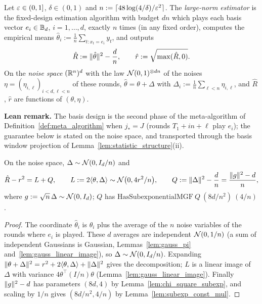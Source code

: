 \begin{definition}\label{def:large_norm_algorithm}
\leanok
{}
Let $\varepsilon \in (0,1]$, $\delta \in (0,1)$ and $n := \lceil 48\log(4/\delta)/\varepsilon^2 \rceil$. The
\emph{large-norm estimator} is the fixed-design estimation algorithm with budget $dn$ which
plays each basis vector $e_i \in \mathbb{B}_d$, $i = 1,\dots,d$, exactly $n$ times (in any fixed
order), computes the empirical means $\hat\theta_i := \frac1n\sum_{t : x_t = e_i} y_t$, and
outputs
\[
  \hat R := \lVert \hat\theta \rVert^2 - \frac dn, \qquad
  \hat r := \sqrt{\max(\hat R, 0)} .
\]
On the \emph{noise space} $(\mathbb{R}^n)^d$ with the law $\mathcal{N}(0,1)^{\otimes dn}$ of the noises
$\eta = (\eta_{i,\ell})_{i<d,\ell<n}$ of these rounds, $\hat\theta = \theta + \Delta$ with
$\Delta_i := \frac1n\sum_{\ell<n}\eta_{i,\ell}$, and $\hat R$, $\hat r$ are functions of
$(\theta, \eta)$.
\end{definition}

\textbf{Lean remark.} The basis design is the second phase of the meta-algorithm of
Definition~\ref{def:meta_algorithm} when $j_* = J$ (rounds $T_1 + in + \ell$ play $e_i$);
the guarantee below is stated on the noise space, and transported through the basis window
projection of Lemma~\ref{lem:statistic_structure}(ii).

\begin{lemma}\label{lem:large_norm_decomposition}
\leanok
{}
On the noise space, $\Delta \sim \mathcal{N}(0, I_d/n)$ and
\[
  \hat R - r^2 = L + Q, \qquad
  L := 2\langle \theta, \Delta \rangle \sim \mathcal{N}\big(0, 4r^2/n\big), \qquad
  Q := \lVert \Delta \rVert^2 - \frac dn = \frac{\lVert g \rVert^2 - d}{n},
\]
where $g := \sqrt n\,\Delta \sim \mathcal{N}(0, I_d)$; $Q$ has
$\mathrm{HasSubexponentialMGF}\ Q\ (8d/n^2)\ (4/n)$.
\end{lemma}

\begin{proof}
\leanok
{}
The coordinate $\hat\theta_i$ is $\theta_i$ plus the average of the $n$ noise variables of
the rounds where $e_i$ is played. These $d$ averages are independent
$\mathcal{N}(0,1/n)$ (a sum of independent Gaussians is Gaussian,
Lemmas~\ref{lem:gauss_pi} and~\ref{lem:gauss_linear_image}), so
$\Delta \sim \mathcal{N}(0, I_d/n)$. Expanding
$\lVert \theta + \Delta \rVert^2 = r^2 + 2\langle \theta, \Delta \rangle + \lVert \Delta \rVert^2$ gives the
decomposition; $L$ is a linear image of $\Delta$ with variance $4\theta^\top(I/n)\theta$
(Lemma~\ref{lem:gauss_linear_image}). Finally $\lVert g \rVert^2 - d$ has parameters $(8d, 4)$ by
Lemma~\ref{lem:chi_square_subexp}, and scaling by $1/n$ gives $(8d/n^2, 4/n)$ by
Lemma~\ref{lem:subexp_const_mul}.
\end{proof}

